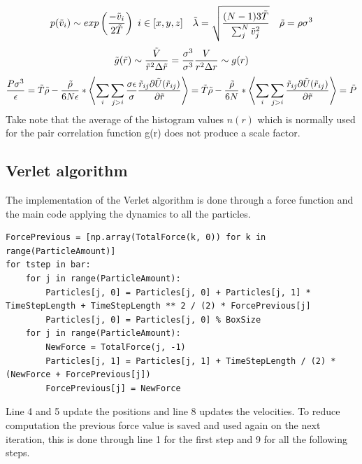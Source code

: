 \documentclass[a4paper,12pt]{article} %
\begin{document}
\begin{equation*}
\begin{gathered}
    p(\Tilde{v}_i) \sim exp\left( \frac{-\Tilde{v}_i}{2\Tilde{T}}\right) \ i\in [x,y,z] \ \ \ \Tilde{\lambda} = \sqrt{\frac{(N-1)3\Tilde{T}}{\sum^N_j\Tilde{v}^2_j}} \ \ \ \Tilde{\rho} = \rho\sigma^3
    \end{gathered}
    \end{equation*}
    \begin{equation}
    \begin{gathered}
    \Tilde{g}(\Tilde{r}) \sim \frac{\Tilde{V}}{\Tilde{r}^2\Delta\Tilde{r}} = \frac{\sigma^3}{\sigma^3}\frac{V}{r^2\Delta r} \sim g(r)\\
    \end{gathered}
    \end{equation}
    \begin{equation*}
    \begin{gathered}
    \frac{P\sigma^3}{\epsilon} = \Tilde{T}\Tilde{\rho} - \frac{\Tilde{\rho}}{6N\epsilon}*\left<\sum_i\sum_{j>i} \frac{\sigma\epsilon}{\sigma}\frac{\Tilde{r}_{ij}\partial\Tilde{U}(\Tilde{r}_{ij})}{\partial\Tilde{r}}\right> =
    \Tilde{T}\Tilde{\rho} - \frac{\Tilde{\rho}}{6N}*\left<\sum_i\sum_{j>i} \frac{\Tilde{r}_{ij}\partial\Tilde{U}(\Tilde{r}_{ij})}{\partial\Tilde{r}}\right> = \Tilde{P}
\end{gathered}
\end{equation*}
Take note that the average of the  histogram values $n(r)$ which is normally used for the pair correlation function g(r) does not produce a scale factor. \par
\subsection{Verlet algorithm}
The implementation of the Verlet algorithm is done through a force function and the main code applying the dynamics to all the particles.
\small
\begin{lstlisting}
ForcePrevious = [np.array(TotalForce(k, 0)) for k in range(ParticleAmount)]
for tstep in bar:
    for j in range(ParticleAmount):
        Particles[j, 0] = Particles[j, 0] + Particles[j, 1] * TimeStepLength + TimeStepLength ** 2 / (2) * ForcePrevious[j]
        Particles[j, 0] = Particles[j, 0] % BoxSize
    for j in range(ParticleAmount):
        NewForce = TotalForce(j, -1)
        Particles[j, 1] = Particles[j, 1] + TimeStepLength / (2) * (NewForce + ForcePrevious[j])
        ForcePrevious[j] = NewForce
\end{lstlisting}
\normalsize
Line 4 and 5 update the positions and line 8 updates the velocities. To reduce computation the previous force value is saved and used again on the next iteration, this is done through line 1 for the first step and 9 for all the following steps.
\end{document}
